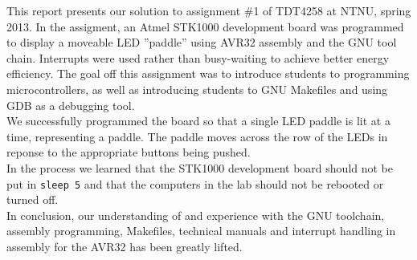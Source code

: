 This report presents our solution to assignment \#1 of TDT4258 at NTNU, spring 2013.
In the assigment, an Atmel STK1000 development board was programmed to display a moveable LED ''paddle'' using AVR32 assembly and the GNU tool chain.
Interrupts were used rather than busy-waiting to achieve better energy efficiency.
The goal off this assignment was to introduce students to programming microcontrollers, as well as introducing students to GNU Makefiles and using GDB as a debugging tool.
\\
We successfully programmed the board so that a single LED paddle is lit at a time, representing a paddle. The paddle moves across the row of the LEDs in reponse to the appropriate buttons being pushed.
\\
In the process we learned that the STK1000 development board should not be put in \texttt{sleep 5} and that the computers in the lab should not be rebooted or turned off.
\\
In conclusion, our understanding of and experience with the GNU toolchain, assembly programming, Makefiles, technical manuals and interrupt handling in assembly for the AVR32 has been greatly lifted.
